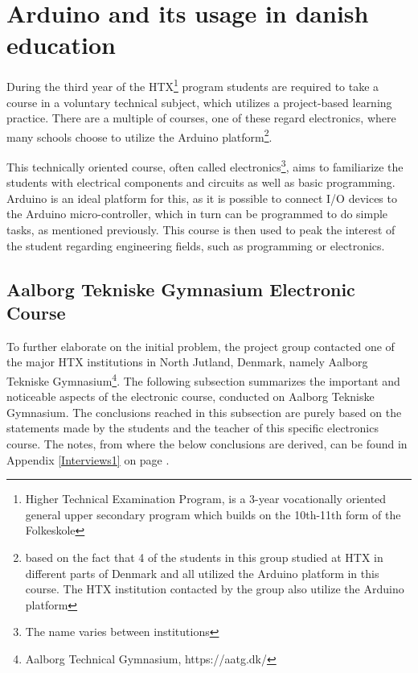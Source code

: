 
\section{Arduino and its usage in danish education}
During the third year of the HTX\footnote{Higher Technical Examination Program, is a 3-year vocationally oriented general upper secondary program which builds on the 10th-11th form of the Folkeskole\cite{htx_wiki}} program students are required to take a course in a voluntary technical subject, which utilizes a project-based learning practice. 
There are a multiple of courses, one of these regard electronics, where many schools choose to utilize the Arduino platform\footnote{based on the fact that 4 of the students in this group studied at HTX in different parts of Denmark and all utilized the Arduino platform in this course. 
The HTX institution contacted by the group also utilize the Arduino platform}\cite{holstebro_education}.

This technically oriented course, often called electronics\footnote{The name varies between institutions}, aims to familiarize the students with electrical components and circuits as well as basic programming\cite{holstebro_electronic}.
Arduino is an ideal platform for this, as it is possible to connect I/O devices to the Arduino micro-controller, which in turn can be programmed to do simple tasks, as mentioned previously. 
This course is then used to peak the interest of the student regarding engineering fields, such as programming or electronics.

\subsection{Aalborg Tekniske Gymnasium Electronic Course}
\label{htxinter}
To further elaborate on the initial problem, the project group contacted one of the major HTX institutions in North Jutland, Denmark, namely Aalborg Tekniske Gymnasium\footnote{Aalborg Technical Gymnasium, https://aatg.dk/}. 
The following subsection summarizes the important and noticeable aspects of the electronic course, conducted on Aalborg Tekniske Gymnasium. 
The conclusions reached in this subsection are purely based on the statements made by the students and the teacher of this specific electronics course.
The notes, from where the below conclusions are derived, can be found in Appendix \ref{Interviews1} on page \pageref{Interviews1}.

